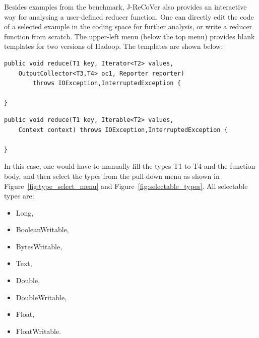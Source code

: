 Besides examples from the benchmark, J-ReCoVer also provides an interactive way
for analysing a user-defined reducer function.  One can directly edit the code
of a selected example in the coding space for further analysis, or write a
reducer function from scratch. The upper-left menu (below the top menu)
provides blank templates for two versions of Hadoop. The templates are shown
below:

\begin{mdframed}[roundcorner=5pt]
\begin{verbatim}
public void reduce(T1 key, Iterator<T2> values,
	OutputCollector<T3,T4> oc1, Reporter reporter)
		throws IOException,InterruptedException {

}
\end{verbatim}
\end{mdframed}

\begin{mdframed}[roundcorner=5pt]
\begin{verbatim}
public void reduce(T1 key, Iterable<T2> values,
	Context context) throws IOException,InterruptedException {

}
\end{verbatim}
\end{mdframed}

In this case, one would have to manually fill the types T1 to T4 and the
function body, and then select the types from the pull-down menu as shown in
Figure~\ref{fig:type_select_menu} and Figure~\ref{fig:selectable_types}. All
selectable types are:

\begin{itemize}
\item Long,
\item BooleanWritable,
\item BytesWritable,
\item Text,
\item Double,
\item DoubleWritable,
\item Float,
\item FloatWritable.
\end{itemize}

